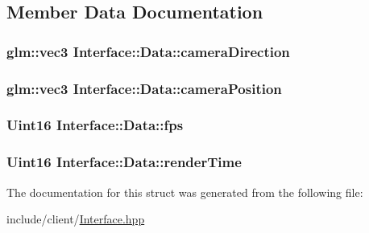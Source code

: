 \subsection{Member Data Documentation}
\hypertarget{structInterface_1_1Data_a8ed6f03a832b15c3a938b233ee83a392}{
\subsubsection[{camera\-Direction}]{\setlength{\rightskip}{0pt plus 5cm}glm\-::vec3 Interface\-::\-Data\-::camera\-Direction}}\label{structInterface_1_1Data_a8ed6f03a832b15c3a938b233ee83a392}
\hypertarget{structInterface_1_1Data_a00ec648034e8c2e155bc3985ed0a75cd}{
\subsubsection[{camera\-Position}]{\setlength{\rightskip}{0pt plus 5cm}glm\-::vec3 Interface\-::\-Data\-::camera\-Position}}\label{structInterface_1_1Data_a00ec648034e8c2e155bc3985ed0a75cd}
\hypertarget{structInterface_1_1Data_a32454196cb04d593a58229fca31cbd9b}{
\subsubsection[{fps}]{\setlength{\rightskip}{0pt plus 5cm}Uint16 Interface\-::\-Data\-::fps}}\label{structInterface_1_1Data_a32454196cb04d593a58229fca31cbd9b}
\hypertarget{structInterface_1_1Data_a13426da957e1f74411b7b01565afe200}{
\subsubsection[{render\-Time}]{\setlength{\rightskip}{0pt plus 5cm}Uint16 Interface\-::\-Data\-::render\-Time}}\label{structInterface_1_1Data_a13426da957e1f74411b7b01565afe200}


The documentation for this struct was generated from the following file\-:\begin{DoxyCompactItemize}
\item 
include/client/\hyperlink{Interface_8hpp}{Interface.\-hpp}\end{DoxyCompactItemize}

